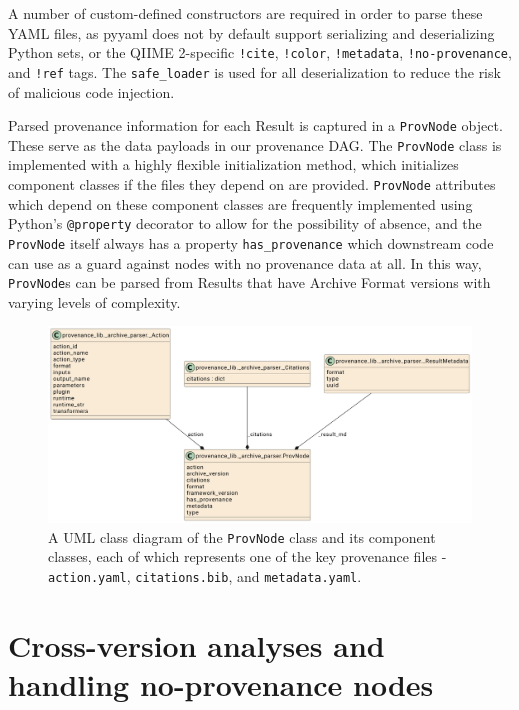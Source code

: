 A number of custom-defined constructors are required in order to parse these
YAML files, as pyyaml does not by default support serializing and deserializing
Python sets, or the QIIME 2-specific \texttt{!cite}, \texttt{!color}, \texttt{!metadata}, \texttt{!no-provenance},
and \texttt{!ref} tags. The \texttt{safe\_loader} is used for all deserialization to reduce the
risk of malicious code injection.

Parsed provenance information for each Result is captured in a \texttt{ProvNode} object.
These serve as the data payloads in our provenance DAG. The \texttt{ProvNode} class is
implemented with a highly flexible initialization method, which initializes
component classes if the files they depend on are provided. \texttt{ProvNode} attributes
which depend on these component classes are frequently implemented using
Python’s \texttt{@property} decorator to allow for the possibility of absence, and the
\texttt{ProvNode} itself always has a property \texttt{has\_provenance} which downstream code can
use as a guard against nodes with no provenance data at all. In this way,
\texttt{ProvNode}s can be parsed from Results that have Archive Format versions with
varying levels of complexity. 

\begin{figure}[htp]
\centering
\includegraphics[width=\textwidth]{figures/ProvNode_UML.png}
\caption[UML Class diagram of the ProvNode class and its components]%
{A UML class diagram of the \texttt{ProvNode} class and its component classes, each of
which represents one of the key provenance files - \texttt{action.yaml}, \texttt{citations.bib},
and \texttt{metadata.yaml}.}
\label{fig:ProvNode_UML}
\end{figure}

\section{Cross-version analyses and handling no-provenance nodes}

